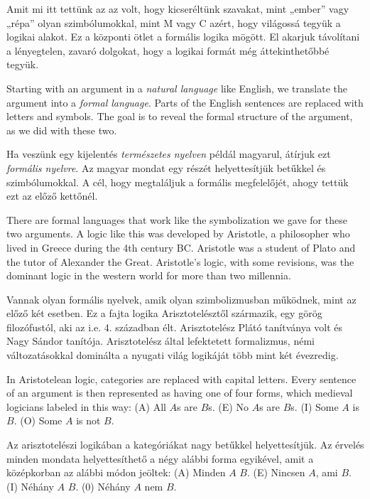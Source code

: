Amit mi itt tettünk az az volt, hogy kicseréltünk szavakat, mint „ember” vagy „répa” olyan szimbólumokkal, mint M vagy C azért, hogy világossá tegyük a logikai alakot. Ez a központi ötlet a formális logika mögött. El akarjuk távolítani a lényegtelen, zavaró dolgokat, hogy a logikai formát még áttekinthetőbbé tegyük.



Starting with an argument in a \emph{natural language} like English, we translate the argument into a \emph{formal language}. Parts of the English sentences are replaced with letters and symbols. The goal is to reveal the formal structure of the argument, as we did with these two.

Ha veszünk egy kijelentés \emph{természetes nyelven} példál magyarul, átírjuk ezt \emph{formális nyelvre}. Az magyar mondat egy részét helyettesítjük betűkkel és szimbólumokkal. A cél, hogy megtaláljuk a formális megfelelőjét, ahogy tettük ezt az előző kettőnél.

There are formal languages that work like the symbolization we gave for these two arguments. A logic like this was developed by Aristotle, a philosopher who lived in Greece during the 4th century BC. Aristotle was a student of Plato and the tutor of Alexander the Great. Aristotle's logic, with some revisions, was the dominant logic in the western world for more than two millennia.

Vannak olyan formális nyelvek, amik olyan szimbolizmusban működnek, mint az előző két esetben. Ez a fajta logika Arisztotelésztől származik, egy görög filozófustól, aki az i.e. 4. században élt. Arisztotelész Plátó tanítványa volt és Nagy Sándor tanítója. Arisztotelész által lefektetett formalizmus, némi változatásokkal dominálta a nyugati világ logikáját több mint két évezredig.

In Aristotelean logic, categories are replaced with capital letters. Every sentence of an argument is then represented as having one of four forms, which medieval logicians labeled in this way: (A) All $A$s are $B$s. (E) No $A$s are $B$s. (I) Some $A$ is $B$. (O) Some $A$ is not $B$.

Az arisztotelészi logikában a kategóriákat nagy betűkkel helyettesítjük. Az érvelés minden mondata helyettesíthető a négy alábbi forma egyikével, amit a középkorban az alábbi módon jeöltek: (A) Minden $A$ $B$. (E) Nincsen $A$, ami $B$. (I) Néhány $A$ $B$.
(0) Néhány $A$ nem $B$.

